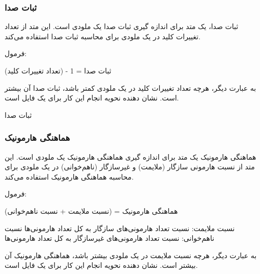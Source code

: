 \subsubsection{ ثبات صدا }

ثبات صدا، یک متد برای اندازه گیری ثبات صدا یک ملودی است. این متد از تعداد تغییرات کلید در یک ملودی برای محاسبه ثبات صدا استفاده می‌کند.

فرمول:

ثبات صدا = 1 - (تعداد تغییرات کلید)

به عبارت دیگر، هرچه تعداد تغییرات کلید در یک ملودی کمتر باشد، ثبات صدا آن بیشتر است.
 نشان دهنده نحویه انجام این کار برای یک فایل  است.


\begin{LTR}
      \begin{algorithm}
            \caption{ثبات صدا }
            \setmainfont{Times New Roman}
            \label{alg:analyze_tonal_stability}
            \begin{algorithmic}
            \end{algorithmic}
      \end{algorithm}
\end{LTR}

\subsubsection{ هماهنگی هارمونیک  }

هماهنگی هارمونیک یک متد برای اندازه گیری هماهنگی هارمونیک یک ملودی است. این متد از نسبت هارمونی سازگار (ملایمت) و غیرسازگار (نا‌هم‌خوانی) در یک ملودی برای محاسبه هماهنگی هارمونیک استفاده می‌کند.

فرمول:

هماهنگی هارمونیک = (نسبت ملایمت + نسبت نا‌هم‌خوانی)

نسبت ملایمت: نسبت تعداد هارمونی‌های سازگار به کل تعداد هارمونی‌ها
نسبت نا‌هم‌خوانی: نسبت تعداد هارمونی‌های غیرسازگار به کل تعداد هارمونی‌ها

به عبارت دیگر، هرچه نسبت ملایمت در یک ملودی بیشتر باشد، هماهنگی هارمونیک آن بیشتر است.
 نشان دهنده نحویه انجام این کار برای یک فایل  است.

